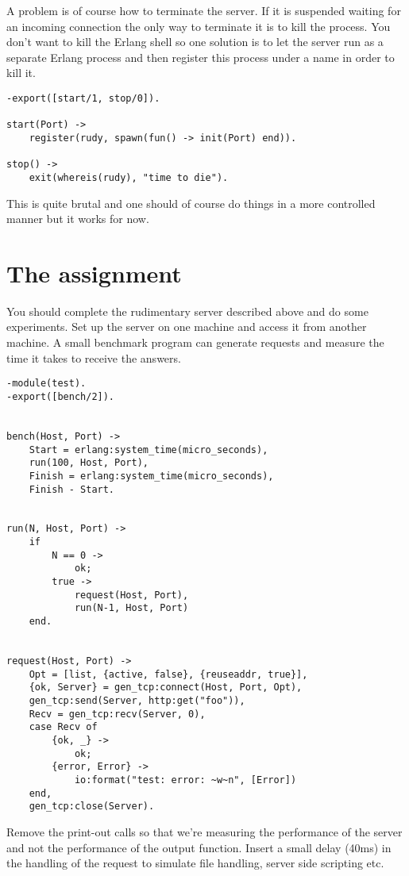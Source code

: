 \documentclass[a4paper, 11pt]{article}
\begin{document}
A problem is of course how to terminate the server. If it is suspended
waiting for an incoming connection the only way to terminate it is to
kill the process. You don't want to kill the Erlang shell so one
solution is to let the server run as a separate Erlang process and then
register this process under a name in order to kill it.

\begin{verbatim}
-export([start/1, stop/0]).

start(Port) ->
    register(rudy, spawn(fun() -> init(Port) end)).

stop() ->
    exit(whereis(rudy), "time to die").
\end{verbatim}    

This is quite brutal and one should of course do things in a more
controlled manner but it works for now.

\section{The assignment}

You should complete the rudimentary server described above and do some
experiments. Set up the server on one machine and access it from
another machine. A small benchmark program can generate requests
and measure the time it takes to receive the answers.

\begin{verbatim}
-module(test).
-export([bench/2]).


bench(Host, Port) ->
    Start = erlang:system_time(micro_seconds),
    run(100, Host, Port),
    Finish = erlang:system_time(micro_seconds),
    Finish - Start.


run(N, Host, Port) ->
    if 
        N == 0 ->
            ok;
        true ->
            request(Host, Port),
            run(N-1, Host, Port)
    end.


request(Host, Port) ->
    Opt = [list, {active, false}, {reuseaddr, true}],
    {ok, Server} = gen_tcp:connect(Host, Port, Opt),
    gen_tcp:send(Server, http:get("foo")),
    Recv = gen_tcp:recv(Server, 0),
    case Recv of
        {ok, _} ->
            ok;
        {error, Error} ->
            io:format("test: error: ~w~n", [Error])
    end,
    gen_tcp:close(Server).
\end{verbatim}

Remove the print-out calls so that we're measuring the performance of
the server and not the performance of the output function. Insert a
small delay (40ms) in the handling of the request to simulate file
handling, server side scripting etc.
\end{document}
